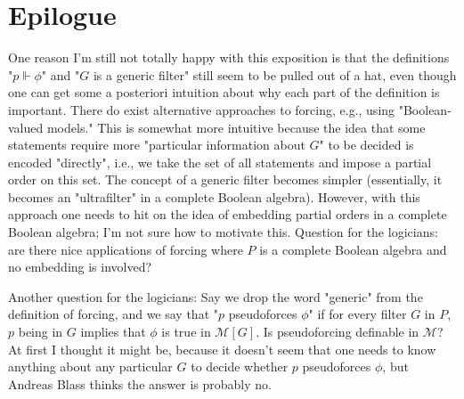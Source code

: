 \documentclass[10pt]{article}
\theoremstyle{definition}
\begin{document}
\section{Epilogue}

One reason I'm still not totally happy with this exposition is that the
definitions "$p \Vdash \phi$" and "$G$ is a generic filter" still seem to be pulled
out of a hat, even though one can get some a posteriori intuition about
why each part of the definition is important.  There do exist alternative
approaches to forcing, e.g., using "Boolean-valued models."  This is
somewhat more intuitive because the idea that some statements require
more "particular information about $G$" to be decided is encoded "directly",
i.e., we take the set of all statements and impose a partial order on this
set.  The concept of a generic filter becomes simpler (essentially, it
becomes an "ultrafilter" in a complete Boolean algebra).  However, with
this approach one needs to hit on the idea of embedding partial orders in
a complete Boolean algebra; I'm not sure how to motivate this.  Question
for the logicians: are there nice applications of forcing where $P$ is a
complete Boolean algebra and no embedding is involved?

Another question for the logicians: Say we drop the word "generic" from
the definition of forcing, and we say that "$p$ pseudoforces $\phi$" if for
every filter $G$ in $P$, $p$ being in $G$ implies that $\phi$ is true in $\mathcal{M}[G]$.  Is
pseudoforcing definable in $\mathcal{M}$?  At first I thought it might be, because it
doesn't seem that one needs to know anything about any particular $G$ to
decide whether $p$ pseudoforces $\phi$, but Andreas Blass thinks the answer is
probably no.
\end{document}

